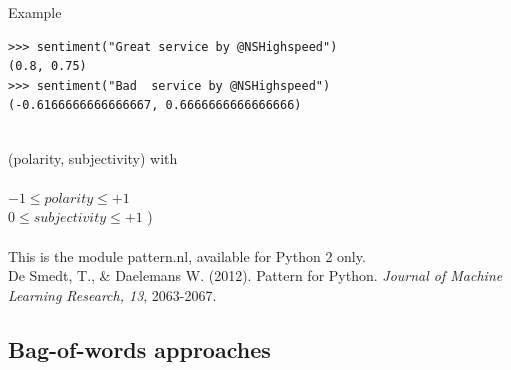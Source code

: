 \documentclass{beamer}
\begin{document}
%
%


\begin{frame}[fragile]{Example}
\begin{lstlisting}
>>> sentiment("Great service by @NSHighspeed")
(0.8, 0.75)
>>> sentiment("Bad  service by @NSHighspeed")
(-0.6166666666666667, 0.6666666666666666)
\end{lstlisting}
	~\\
	\footnotesize{(polarity, subjectivity) with \\ ~ \\
		$-1 \leq polarity \leq +1$\\
		$0 \leq subjectivity \leq +1$ )} \\~\\
	\tiny{This is the module pattern.nl, available for Python 2 only. \\ De Smedt, T., \& Daelemans W. (2012).  Pattern for Python. \emph{Journal of Machine Learning Research, 13}, 2063-2067.\\}
\end{frame}

\subsection{Bag-of-words approaches}
\end{document}
